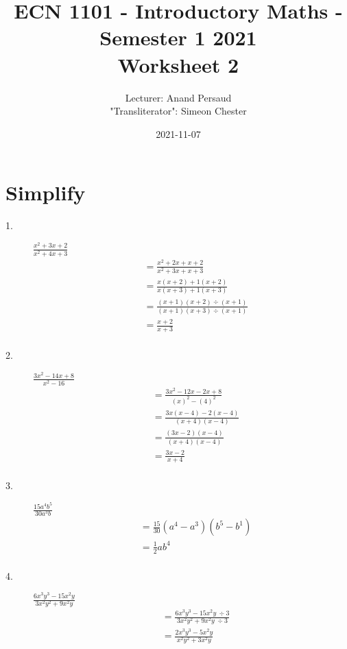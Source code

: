 \documentclass{article}
\title{%
    ECN 1101 - Introductory Maths - Semester 1 2021 \\
    \large Worksheet 2 \\
}
\author{Lecturer: Anand Persaud \\ "Transliterator": Simeon Chester \\}
\date{2021-11-07}
\begin{document}
\maketitle
{}
\section*{Simplify}

\begin{description}
    \item[1. ]  $\frac{x^2+3x+2}{x^2+4x+3}$
        $$
            \begin{aligned}
                 & = \frac{x^2 + 2x + x + 2}{x^2 + 3x + x + 3}            \\
                 & = \frac{x(x+2)+ 1(x+2)}{x(x+3)+1(x+3)}                 \\
                 & = \frac{(x+1)(x+2) \div (x+1)}{(x+1)(x+3) \div{(x+1)}} \\
                 & = \frac{x+2}{x+3}                                      \\
            \end{aligned}
        $$
    \item[2. ]  $\frac{3x^2-14x+8}{x^2-16}$
        $$
            \begin{aligned}
                 & = \frac{3x^2 - 12x - 2x + 8}{(x)^2-(4)^2} \\
                 & = \frac{3x(x-4)-2(x-4)}{(x+4)(x-4)}       \\
                 & = \frac{(3x-2)(x-4)}{(x+4)(x-4)}          \\
                 & = \frac{3x-2}{x+4}                        \\
            \end{aligned}
        $$
    \item[3. ] $\frac{15a^4b^5}{30a^3b}$
        $$
            \begin{aligned}
                 & = \frac{15}{30}(a^4-a^3)(b^5-b^1) \\
                 & = \frac{1}{2}ab^4                 \\
            \end{aligned}
        $$
    \item[4. ] $\frac{6x^3y^3-15x^2y}{3x^2y^2+9x^2y}$
        $$
            \begin{aligned}
                 & = \frac{6x^3 y^3 - 15x^2y \ \div 3}{3x^2y^2+9x^2y \ \div 3}   \\
                 & = \frac{2x^3 y^3 - 5x^2y}{x^2y^2+3x^2y}                       \\

\end{aligned}$$
\end{description}
\end{document}
